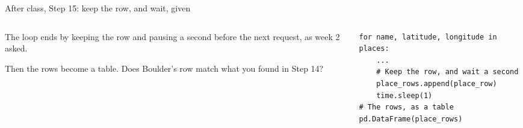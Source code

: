 \documentclass[9pt,aspectratio=169]{beamer}
\begin{document}
\begin{frame}[fragile]{After class, Step 15: keep the row, and wait, given}
    \begin{columns}[T]
        \begin{column}{0.37\textwidth}
            The loop ends by keeping the row and pausing a second before the next request, as week 2 asked.

            \medskip
            Then the rows become a table. Does Boulder's row match what you found in Step 14?
        \end{column}
        \begin{column}{0.6\textwidth}
\begin{lstlisting}
for name, latitude, longitude in places:
    ...
    # Keep the row, and wait a second
    place_rows.append(place_row)
    time.sleep(1)
# The rows, as a table
pd.DataFrame(place_rows)
\end{lstlisting}
        \end{column}
    \end{columns}
\end{frame}
\end{document}
